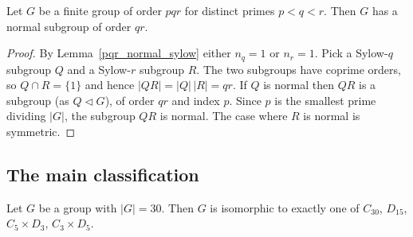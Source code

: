 \begin{theorem}\label{pqr_normal_subgroup_qr}
Let $G$ be a finite group of order $pqr$ for distinct primes $p < q < r$.
Then $G$ has a normal subgroup of order $qr$.
\end{theorem}

\begin{proof}
By Lemma~\ref{pqr_normal_sylow} either $n_q = 1$ or $n_r = 1$.
Pick a Sylow-$q$ subgroup $Q$ and a Sylow-$r$ subgroup $R$.
The two subgroups have coprime orders, so $Q \cap R = \{1\}$ and hence
$|QR| = |Q|\,|R| = qr$.
If $Q$ is normal then $QR$ is a subgroup (as $Q \lhd G$),
of order $qr$ and index $p$. Since $p$ is the smallest prime dividing $|G|$,
the subgroup $QR$ is normal. The case where $R$ is normal is symmetric.
\end{proof}

\subsection{The main classification}

\begin{theorem}\label{order_30_classification}
Let $G$ be a group with $|G| = 30$. Then $G$ is isomorphic to exactly one of
$C_{30}$, $D_{15}$, $C_5 \times D_3$, $C_3 \times D_5$.
\end{theorem}

